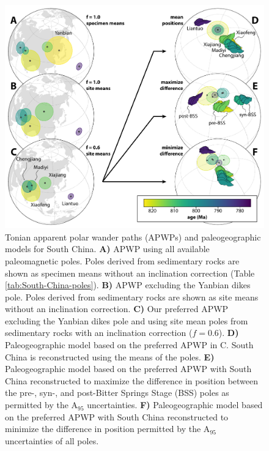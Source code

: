 \begin{figure}[h!]
    \centering
    \includegraphics[width=\textwidth]{figures/Xiajiang/SChina-APWP.pdf}
    \caption[Tonian apparent polar wander paths and paleogeographic models for South China.]{Tonian apparent polar wander paths (APWPs) and paleogeographic models for South China. \textbf{A)} APWP using all available paleomagnetic poles. Poles derived from sedimentary rocks are shown as specimen means without an inclination correction (Table \ref{tab:South-China-poles}). \textbf{B)} APWP excluding the Yanbian dikes pole. Poles derived from sedimentary rocks are shown as site means without an inclination correction. \textbf{C)} Our preferred APWP excluding the Yanbian dikes pole and using site mean poles from sedimentary rocks with an inclination correction ($f=0.6$). \textbf{D)} Paleogeographic model based on the preferred APWP in C. South China is reconstructed using the means of the poles. \textbf{E)} Paleogeographic model based on the preferred APWP with South China reconstructed to maximize the difference in position between the pre-, syn-, and post-Bitter Springs Stage (BSS) poles as permitted by the A$_{95}$ uncertainties. \textbf{F)} Paleogeographic model based on the preferred APWP with South China reconstructed to minimize the difference in position permitted by the A$_{95}$ uncertainties of all poles.}
    \label{fig:SChina-APWP}
\end{figure}

